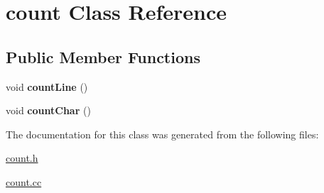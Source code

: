 \hypertarget{classcount}{}\section{count Class Reference}
\label{classcount}
\subsection*{Public Member Functions}
\begin{DoxyCompactItemize}
\item 
\mbox{\label{classcount_afb37b2f723aca198f56a8de4471524d1}} 
void {\bfseries count\+Line} ()
\item 
\mbox{\label{classcount_ae417cca05e849d577a088b6cac0f18d8}} 
void {\bfseries count\+Char} ()
\end{DoxyCompactItemize}


The documentation for this class was generated from the following files\+:\begin{DoxyCompactItemize}
\item 
\hyperlink{count_8h}{count.\+h}\item 
\hyperlink{count_8cc}{count.\+cc}\end{DoxyCompactItemize}
